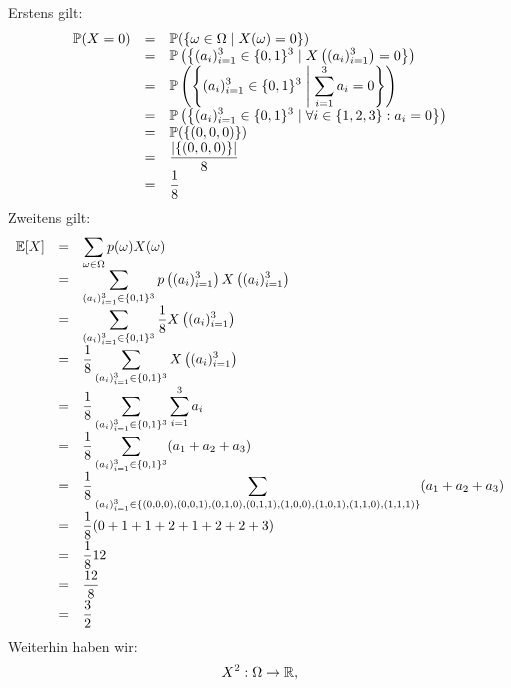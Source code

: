 \documentclass{article}
\begin{document}
\begin{solution}
Erstens gilt:
\[
\begin{array}{>{\displaystyle}r>{\displaystyle}c>{\displaystyle}l}
\mathbb{P}(X = 0) & = & \mathbb{P}(\{\omega \in \Omega \mid X(\omega) = 0\}) \\
& = & \mathbb{P} \left( \left\{ (a_i)_{i = 1}^3 \in \{0, 1\}^3 \mid X \left( (a_i)_{i = 1}^3 \right) = 0 \right\} \right) \\
& = & \mathbb{P} \left( \left\{ (a_i)_{i = 1}^3 \in \{0, 1\}^3 \;\middle|\; \sum_{i = 1}^3 a_i = 0 \right\} \right) \\
& = & \mathbb{P} \left( \left\{ (a_i)_{i = 1}^3 \in \{0, 1\}^3 \mid \forall i \in \{1, 2, 3\}: a_i = 0 \right\} \right) \\
& = & \mathbb{P}(\{(0, 0, 0)\}) \\
& = & \frac{|\{(0, 0, 0)\}|}{8} \\
& = & \frac{1}{8} \\
\end{array}
\]
Zweitens gilt:
\[
\begin{array}{>{\displaystyle}r>{\displaystyle}c>{\displaystyle}l}
\mathbb{E}[X] & = & \sum_{\omega \in \Omega} p(\omega) X(\omega) \\
& = & \sum_{(a_i)_{i = 1}^3 \in \{0, 1\}^3} p \left( (a_i)_{i = 1}^3 \right) X \left( (a_i)_{i = 1}^3 \right) \\
& = & \sum_{(a_i)_{i = 1}^3 \in \{0, 1\}^3} \frac{1}{8} X \left( (a_i)_{i = 1}^3 \right) \\
& = & \frac{1}{8} \sum_{(a_i)_{i = 1}^3 \in \{0, 1\}^3} X \left( (a_i)_{i = 1}^3 \right) \\
& = & \frac{1}{8} \sum_{(a_i)_{i = 1}^3 \in \{0, 1\}^3} \sum_{i = 1}^3 a_i \\
& = & \frac{1}{8} \sum_{(a_i)_{i = 1}^3 \in \{0, 1\}^3} (a_1 + a_2 + a_3) \\
& = & \frac{1}{8} \sum_{(a_i)_{i = 1}^3 \in \{(0, 0, 0), (0, 0, 1), (0, 1, 0), (0, 1, 1), (1, 0, 0), (1, 0, 1), (1, 1, 0), (1, 1, 1)\}} (a_1 + a_2 + a_3) \\
& = & \frac{1}{8} (0 + 1 + 1 + 2 + 1 + 2 + 2 + 3) \\[5pt]
& = & \frac{1}{8} 12 \\[5pt]
& = & \frac{12}{8} \\[5pt]
& = & \frac{3}{2} \\
\end{array}
\]
Weiterhin haben wir:
\[
\begin{array}{>{\displaystyle}l}
X^2: \Omega \to \mathbb{R}, \\

\end{array}\]
\end{solution}
\end{document}
